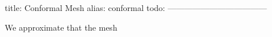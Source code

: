 title: Conformal Mesh
alias: conformal
todo:
------------------------------------

We approximate that the mesh
